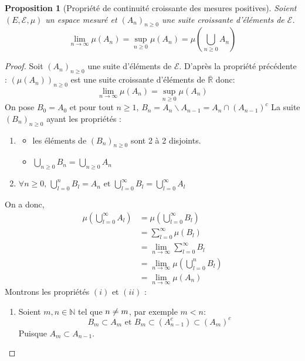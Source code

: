 \documentclass{article}[11pt]
\newtheorem{proposition}[theorem]{Proposition}
\theoremstyle{definition}
\begin{document}
\begin{proposition}[Propriété de continuité croissante des mesures positives]
  Soient $(E, \mathcal{E}, \mu)$ un espace mesuré et $(A_n)_{n \geq 0}$ une suite croissante d'éléments de $\mathcal{E}$.
  \[ \lim_{n\to\infty} \mu(A_n) = \sup_{n \geq 0} \mu(A_n) = \mu(\bigcup_{n \geq 0} A_n)\]
\end{proposition}
\begin{proof}
  Soit $(A_n)_{n \geq 0}$ une suite d'éléments de $\mathcal{E}$.
  D'après la propriété précédente : $(\mu(A_n))_{n \geq 0}$ est une suite croissante d'éléments de $\overline{\mathbb{R}}$ donc: 
  \[ \lim_{n\to\infty}\mu(A_n) = \sup_{n \geq 0} \mu(A_n)\]
  On pose $B_0 = A_0$ et pour tout $ n\geq 1 \text{, } B_n = A_n \backslash A_{n-1} = A_n \cap (A_{n-1})^c$
  La suite $(B_n)_{n \geq 0}$ ayant les propriétés :
  \begin{enumerate}
    \item \begin{itemize}
      \item les éléments de $(B_n)_{n \geq 0}$ sont 2 à 2 disjoints.
      \item $\bigcup_{n \geq 0}B_n = \bigcup_{n \geq 0}A_n$
    \end{itemize}
  \item $\displaystyle \forall n \geq 0 \text{, } \bigcup_{l = 0}^{n} B_l = A_n \text{ et } \bigcup_{l=0}^{\infty}B_l = \bigcup_{l=0}^{\infty}A_l$
  \end{enumerate}
  On a donc,
  \begin{equation}
  \begin{split}
    \mu(\bigcup_{l=0}^{\infty} A_l) &= \mu(\bigcup_{l=0}^{\infty}B_l)\\ 
                  &= \sum_{l=0}^{\infty}\mu(B_l) \\ 
                  &= \lim_{n \to \infty} \sum_{ l=0}^{\infty}B_l\\ 
                  &= \lim_{n \to \infty} \mu(\bigcup_{l=0}^{n}B_l) \\ 
                  &= \lim_{n \to\infty}\mu(A_n)
  \end{split}
  \end{equation}
  Montrons les propriétés $(i)$ et $(ii)$ :  
  \begin{enumerate}
    \item Soient $m,n \in \mathbb{N}$  tel que $n \centernot = m$, par exemple $ m < n$:
      \[ B_m \subset A_m \text{ et } B_m \subset (A_{n-1}^c) \subset (A_m)^c \]
      Puisque $A_m \subset A_{n-1}$.

\end{enumerate}
\end{proof}
\end{document}
